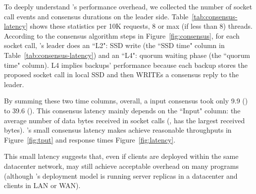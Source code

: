 
To deeply understand \xxx's performance overhead, we collected the number of
socket call events and consensus durations on the leader side.
Table~\ref{tab:consensus-latency} shows these statistics per 10K requests, 8
or max (if less than 8) threads. According to the consensus algorithm steps in
Figure~\ref{fig:consensus}, for each socket call, \xxx's leader does an ``L2":
SSD write (the ``SSD time" column in Table~\ref{tab:consensus-latency}) and an
``L4": quorum waiting phase (the ``quorum time" column). L4 implies backups'
performance because each backup stores the proposed socket call in local SSD and
then WRITEs a consensus reply to the leader.

By summing these two time columns, overall, a \xxx input consensus took only
9.9 \us (\redis) to 39.6 \us (\mongodb). This consensus latency mainly depends
on the ``Input" column: the average number of data bytes received in socket
calls (\eg, \mongodb has the largest received bytes). \xxx's small consensus
latency makes \xxx achieve reasonable throughputs in Figure~\ref{fig:tput} and
response times Figure~\ref{fig:latency}.

This small latency suggests that, even if clients are deployed within the same
datacenter network, \xxx may still achieve acceptable overhead on many programs
(although \xxx's deployment model is running server replicas in a datacenter and
clients in LAN
or WAN).









